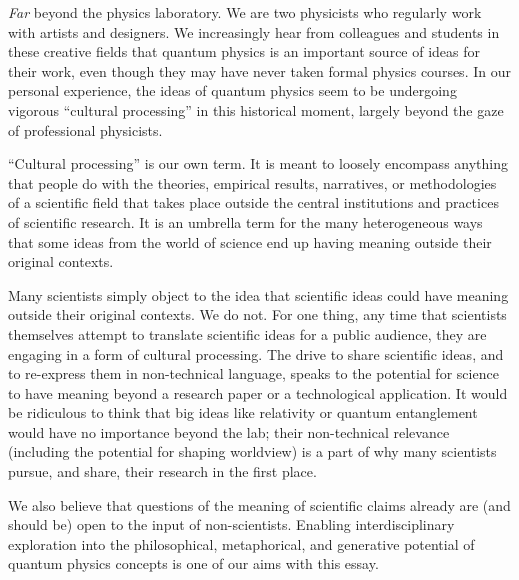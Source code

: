 \documentclass[12pt,onecolumn,preprintnumbers,amsmath,amssymbn,reprint,nofootinbib,superscriptaddress]{revtex4}    %
\begin{document}
{\em Far} beyond the physics laboratory.  We are two physicists who regularly work with artists and designers.  We increasingly hear from colleagues and students in these creative fields that quantum physics is an important source of ideas for their work, even though they may have never taken formal physics courses.  In our personal experience, the ideas of quantum physics seem to be undergoing vigorous ``cultural processing'' in this historical moment, largely beyond the gaze of professional physicists.  

``Cultural processing'' is our own term.  It is meant to loosely encompass anything that people do with the theories, empirical results, narratives, or methodologies of a scientific field that takes place outside the central institutions and practices of scientific research.  It is an umbrella term for the many heterogeneous ways that some ideas from the world of science end up having meaning outside their original contexts.

Many scientists simply object to the idea that scientific ideas could have meaning outside their original contexts.  We do not.  For one thing, any time that scientists themselves attempt to translate scientific ideas for a public audience, they are engaging in a form of cultural processing.  The drive to share scientific ideas, and to re-express them in non-technical language, speaks to the potential for science to have meaning beyond a research paper or a technological application.  It would be ridiculous to think that big ideas like relativity or quantum entanglement would have no importance beyond the lab; their non-technical relevance (including the potential for shaping worldview) is a part of why many scientists pursue, and share, their research in the first place.  

We also believe that questions of the meaning of scientific claims already are (and should be) open to the input of non-scientists.  Enabling interdisciplinary exploration into the philosophical, metaphorical, and generative potential of quantum physics concepts is one of our aims with this essay. 
\end{document}
